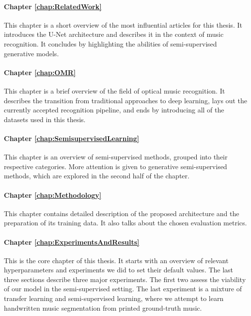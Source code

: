 \paragraph*{Chapter \ref{chap:RelatedWork}} This chapter is a short overview of the most influential articles for this thesis. It introduces the U-Net architecture and describes it in the context of music recognition. It concludes by highlighting the abilities of semi-supervised generative models.

\paragraph*{Chapter \ref{chap:OMR}} This chapter is a brief overview of the field of optical music recognition. It describes the transition from traditional approaches to deep learning, lays out the currently accepted recognition pipeline, and ends by introducing all of the datasets used in this thesis.

\paragraph*{Chapter \ref{chap:SemisupervisedLearning}} This chapter is an overview of semi-supervised methods, grouped into their respective categories. More attention is given to generative semi-supervised methods, which are explored in the second half of the chapter.

\paragraph*{Chapter \ref{chap:Methodology}} This chapter contains detailed description of the proposed architecture and the preparation of its training data. It also talks about the chosen evaluation metrics.

\paragraph*{Chapter \ref{chap:ExperimentsAndResults}} This is the core chapter of this thesis. It starts with an overview of relevant hyperparameters and experiments we did to set their default values. The last three sections describe three major experiments. The first two assess the viability of our model in the semi-supervised setting. The last experiment is a mixture of transfer learning and semi-supervised learning, where we attempt to learn handwritten music segmentation from printed ground-truth music.
